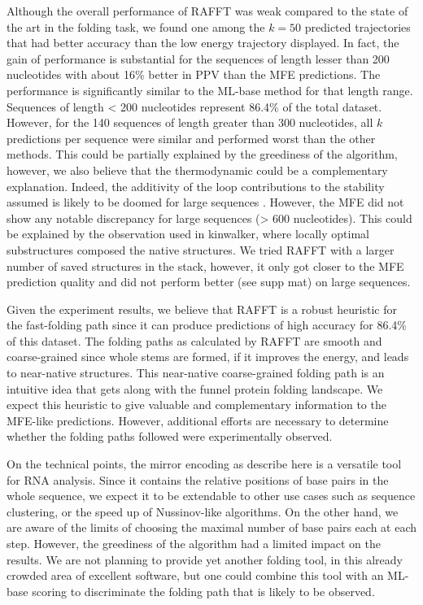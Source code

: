 \documentclass[a4paper,12pt]{article}
\begin{document}
{{Although the overall performance of RAFFT was weak compared to the state of the
art in the folding task, we found one among the \(k=50\) predicted trajectories
that had better accuracy than the low energy trajectory displayed. In fact, the
gain of performance is substantial for the sequences of length lesser than 200
nucleotides with about 16\% better in PPV than the MFE predictions. The
performance is significantly similar to the ML-base method for that length
range. Sequences of length \textless{} 200 nucleotides represent 86.4\% of the total
dataset. However, for the 140 sequences of length greater than 300 nucleotides,
all \(k\) predictions per sequence were similar and performed worst than the other
methods. This could be partially explained by the greediness of the algorithm,
however, we also believe that the thermodynamic could be a complementary
explanation. Indeed, the additivity of the loop contributions to the stability
assumed is likely to be doomed for large sequences \cite{tinoco99_how_rna_folds}.
However, the MFE did not show any notable discrepancy for large sequences (\textgreater{}
600 nucleotides). This could be explained by the observation used in kinwalker,
where locally optimal substructures composed the native structures. We tried
RAFFT with a larger number of saved structures in the stack, however, it only
got closer to the MFE prediction quality and did not perform better (see supp
mat) on large sequences.

Given the experiment results, we believe that RAFFT is a robust heuristic for
the fast-folding path since it can produce predictions of high accuracy for
86.4\% of this dataset. The folding paths as calculated by RAFFT are smooth and
coarse-grained since whole stems are formed, if it improves the energy, and
leads to near-native structures. This near-native coarse-grained folding path is
an intuitive idea that gets along with the funnel protein folding landscape. We
expect this heuristic to give valuable and complementary information to the
MFE-like predictions. However, additional efforts are necessary to determine
whether the folding paths followed were experimentally observed.

On the technical points, the mirror encoding as describe here is a versatile
tool for RNA analysis. Since it contains the relative positions of base pairs in
the whole sequence, we expect it to be extendable to other use cases such as
sequence clustering, or the speed up of Nussinov-like algorithms. On the other
hand, we are aware of the limits of choosing the maximal number of base pairs
each at each step. However, the greediness of the algorithm had a limited impact
on the results. We are not planning to provide yet another folding tool, in this
already crowded area of excellent software, but one could combine this tool with
an ML-base scoring to discriminate the folding path that is likely to be
observed.

}}
\end{document}
